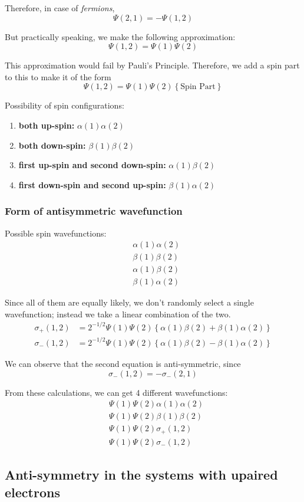 \documentclass[12pt]{article}
\theoremstyle{definition}
\theoremstyle{definition}
\begin{document}
Therefore, in case of \textit{fermions}, 
\[
	\Psi(2, 1) = -\Psi(1, 2)
\]

But practically speaking, we make the following approximation:
\[
	\Psi(1, 2) = \Psi(1) \Psi(2)
\]

This approximation would fail by Pauli's Principle. Therefore, we add a spin part to this to make it of the form
\[
	\Psi(1, 2) = \Psi(1) \Psi(2) \left\{ \textrm{Spin Part} \right\}
\]

Possibility of spin configurations:
\begin{enumerate}
	\item \textbf{both up-spin:} $\alpha(1)\alpha(2)$
	\item \textbf{both down-spin:} $\beta(1)\beta(2)$
	\item \textbf{first up-spin and second down-spin:} $\alpha(1)\beta(2)$
	\item \textbf{first down-spin and second up-spin:} $\beta(1)\alpha(2)$
\end{enumerate}

\subsubsection{Form of antisymmetric wavefunction}

Possible spin wavefunctions:
\begin{align}
	& \alpha(1)\alpha(2) \\
	& \beta(1)\beta(2) \\
	& \alpha(1)\beta(2) \\
	& \beta(1)\alpha(2)
\end{align}

Since all of them are equally likely, we don't randomly select a single wavefunction; instead we take a linear combination of the two.
\begin{align*}
	\sigma_+(1, 2) &=  2^{-1/2} \Psi(1)\Psi(2) \left\{ \alpha(1)\beta(2) + \beta(1)\alpha(2) \right\} \\
	\sigma_-(1, 2) &=  2^{-1/2} \Psi(1)\Psi(2) \left\{ \alpha(1)\beta(2) - \beta(1)\alpha(2) \right\}
\end{align*}

We can observe that the second equation is anti-symmetric, since 
\[
	\sigma_-(1, 2) = - \sigma_-(2, 1)
\]

From these calculations, we can get 4 different wavefunctions:
\begin{align*}
	&\Psi(1)\Psi(2)\alpha(1)\alpha(2) \\
	&\Psi(1)\Psi(2)\beta(1)\beta(2) \\
	&\Psi(1)\Psi(2) \sigma_+(1, 2) \\
	&\Psi(1)\Psi(2) \sigma_-(1, 2)
\end{align*}

\subsection{Anti-symmetry in the systems with upaired electrons}
\end{document}
